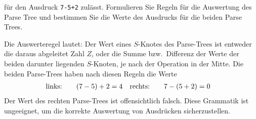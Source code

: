 für den Ausdruck \texttt{7-5+2} zulässt.
Formulieren Sie Regeln für die Auswertung des Parse Tree und bestimmen
Sie die Werte des Ausdrucks für die beiden Parse Trees.

\begin{loesung}
Die Auswerteregel lautet:
Der Wert eines $S$-Knotes des Parse-Trees ist entweder die daraus
abgeleitet Zahl $Z$, oder die Summe bzw.~Differenz der Werte der beiden
darunter liegenden $S$-Knoten, je nach der Operation in der Mitte.
Die beiden Parse-Trees haben nach diesen Regeln die Werte
\begin{align*}
\text{links:\qquad}&(7-5)+2=4
&
\text{rechts:\qquad}&7-(5+2)=0
\end{align*}
Der Wert des rechten Parse-Trees ist offensichtlich falsch.
Diese Grammatik ist ungeeignet, um die korrekte Auswertung
von Ausdrücken sicherzustellen.
\end{loesung}


